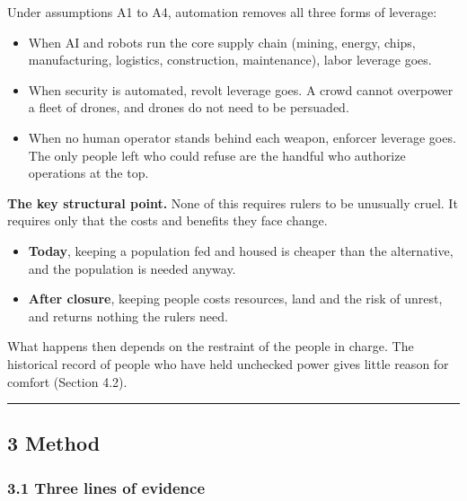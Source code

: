 \documentclass[
  10pt,
]{article}
\providecommand{\tightlist}{%
  \setlength{\itemsep}{0pt}\setlength{\parskip}{0pt}}
\begin{document}
Under assumptions A1 to A4, automation removes all three forms of leverage:

\begin{itemize}
\tightlist
\item
  When AI and robots run the core supply chain (mining, energy, chips, manufacturing, logistics,
  construction, maintenance), labor leverage goes.
\item
  When security is automated, revolt leverage goes. A crowd cannot overpower a fleet of drones, and
  drones do not need to be persuaded.
\item
  When no human operator stands behind each weapon, enforcer leverage goes. The only people left who
  could refuse are the handful who authorize operations at the top.
\end{itemize}

\textbf{The key structural point.} None of this requires rulers to be unusually cruel. It requires
only that the costs and benefits they face change.

\begin{itemize}
\tightlist
\item
  \textbf{Today}, keeping a population fed and housed is cheaper than the alternative, and the
  population is needed anyway.
\item
  \textbf{After closure}, keeping people costs resources, land and the risk of unrest, and returns
  nothing the rulers need.
\end{itemize}

What happens then depends on the restraint of the people in charge. The historical record of people
who have held unchecked power gives little reason for comfort (Section 4.2).

\begin{center}\rule{0.5\linewidth}{0.5pt}\end{center}

\subsection{3 Method}\label{method}

\subsubsection{3.1 Three lines of evidence}\label{three-lines-of-evidence}
\end{document}
